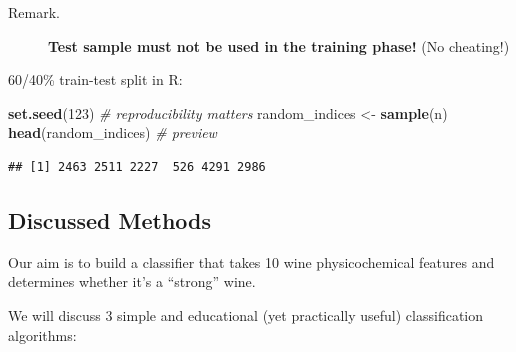 \documentclass[10pt,b5paper,krantz1]{krantz}
\newenvironment{Shaded}{\begin{snugshade}}{\end{snugshade}}
\newcommand{\CommentTok}[1]{\textcolor[rgb]{0.37,0.37,0.37}{\textit{#1}}}
\newcommand{\DecValTok}[1]{\textcolor[rgb]{0.06,0.06,0.06}{#1}}
\newcommand{\FloatTok}[1]{\textcolor[rgb]{0.06,0.06,0.06}{#1}}
\newcommand{\KeywordTok}[1]{\textcolor[rgb]{0.27,0.27,0.27}{\textbf{#1}}}
\newcommand{\NormalTok}[1]{#1}
\newcommand{\OperatorTok}[1]{\textcolor[rgb]{0.43,0.43,0.43}{\textbf{#1}}}
\newcommand{\StringTok}[1]{\textcolor[rgb]{0.5,0.5,0.5}{#1}}
\begin{document}
\begin{description}
\item[Remark.]
\textbf{Test sample must not be used in the training phase!} (No cheating!)
\end{description}

60/40\% train-test split in R:

\begin{Shaded}
\begin{Highlighting}[]
\KeywordTok{set.seed}\NormalTok{(}\DecValTok{123}\NormalTok{) }\CommentTok{# reproducibility matters}
\NormalTok{random_indices <-}\StringTok{ }\KeywordTok{sample}\NormalTok{(n)}
\KeywordTok{head}\NormalTok{(random_indices) }\CommentTok{# preview}
\end{Highlighting}
\end{Shaded}

\begin{verbatim}
## [1] 2463 2511 2227  526 4291 2986
\end{verbatim}

\begin{Shaded}
\end{Shaded}

\hypertarget{discussed-methods}{%
\subsection{Discussed Methods}\label{discussed-methods}}

Our aim is to build a classifier that takes 10 wine physicochemical
features and determines whether it's a ``strong'' wine.

We will discuss 3 simple and educational (yet practically useful)
classification algorithms:
\end{document}
